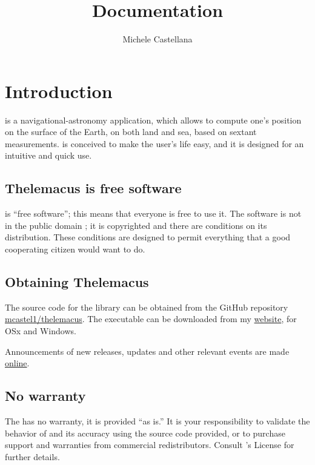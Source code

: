 \documentclass{ol-softwaremanual}
\title{Documentation}
\author{Michele Castellana}
\begin{document}
\maketitle

\tableofcontents
\newpage

\section{Introduction}


\thel  is a navigational-astronomy application, which allows to compute one's position on the surface of the Earth, on both land and sea, based on sextant measurements. \thel is conceived to make the user's life easy, and it is designed for an intuitive and quick use. 

\subsection{Thelemacus is free software}

\thel is ``free software''; this means that everyone is free to use it. The software is not in the public domain \cite{castellana2024thelemacus}; it is copyrighted and there are conditions on its distribution. These conditions are designed to permit everything that a good cooperating citizen would want to do.

\subsection{Obtaining Thelemacus}

The source code for the library can be obtained from the GitHub repository \href{https://github.com/mcastel1/thelemacus}{mcastel1/thelemacus}. The executable can be downloaded from my \href{https://sites.google.com/site/michelecastellana/home}{website}, for OSx and Windows.  

Announcements of new releases, updates and other relevant events are made \href{https://sites.google.com/site/michelecastellana/home}{online}. 

\subsection{No warranty}

The \thel has no warranty, it is provided ``as is.'' It is your responsibility to validate the behavior of \thel and its accuracy using the source code provided, or to purchase support and warranties from commercial redistributors. Consult \thel's  License for further details.
\end{document}
